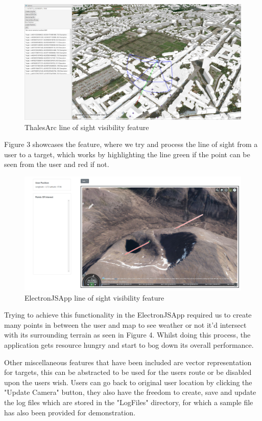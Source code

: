 \documentclass{l3proj}
\begin{document}
\begin{figure}[h]
    \caption{ThalesArc line of sight visibility feature}
    \centering
    \includegraphics[width=\textwidth]{ArcGISLOS.jpg}
\end{figure}

Figure 3 showcases the feature, where we try and process the line of sight from a user to a target, which works by highlighting the line green if the point can be seen from the user and red if not.

\begin{figure}[h]
    \caption{ElectronJSApp line of sight visibility feature}
    \centering
    \includegraphics[width=\textwidth]{ElectronJSLOS.jpg}
\end{figure}

Trying to achieve this functionality in the ElectronJSApp required us to create many points in between the user and map to see weather or not it'd intersect with its surrounding terrain as seen in Figure 4. Whilst doing this process, the application gets resource hungry and start to bog down its overall performance. 

Other miscellaneous features that have been included are vector representation for targets, this can be abstracted to be used for the users route or be disabled upon the users wish. Users can go back to original user location by clicking the "Update Camera" button, they also have the freedom to create, save and update the log files which are stored in the "LogFiles" directory, for which a sample file has also been provided for demonstration.
\end{document}
